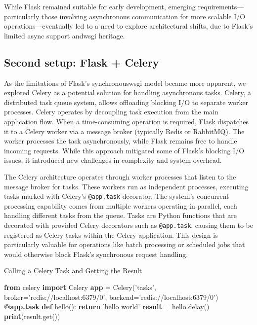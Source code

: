         While Flask remained suitable for early development, emerging requirements—particularly those involving asynchronous 
        communication for more scalable I/O operations—eventually led to a need to explore architectural shifts, due to 
        Flask's limited async support and\ac{wsgi} heritage. 
    
    \subsection{Second setup: Flask + Celery}

        As the limitations of Flask's synchronous\ac{wsgi} model became more apparent, we explored Celery as a potential solution for handling 
        asynchronous tasks. Celery, a distributed task queue system, allows offloading blocking I/O to separate worker processes. 
        Celery operates by decoupling task execution from the main application flow. When a time-consuming operation is required, Flask 
        dispatches it to a Celery worker via a message broker (typically Redis or RabbitMQ). The worker processes the task asynchronously, 
        while Flask remains free to handle incoming requests. While this approach mitigated some of Flask's blocking I/O issues, it 
        introduced new challenges in complexity and system overhead.

        The Celery architecture operates through worker processes that listen to the message broker for tasks. These workers run as 
        independent processes, executing tasks marked with Celery's \texttt{@app.task} decorator. The system's concurrent processing 
        capability comes from multiple workers operating in parallel, each handling different tasks from the queue. Tasks are Python 
        functions that are decorated with provided Celery decorators such as \texttt{@app.task}, causing them to be registered as 
        Celery tasks within the Celery application. This design is particularly valuable for operations like batch processing or 
        scheduled jobs that would otherwise block Flask's synchronous request handling.

        \begin{algorithm}
            \caption{Calling a Celery Task and Getting the Result}\label{celery-call-result}
            \begin{algorithmic}[1]
            \State \textbf{from} celery \textbf{import} Celery
            \State
            \State \textbf{app} = Celery('tasks', broker='redis://localhost:6379/0', backend='redis://localhost:6379/0')
            \State
            \State \textbf{@app.task}
            \State \textbf{def} hello():
            \State \hspace{1em} \textbf{return} 'hello world'
            \State
            \State \textbf{result} = hello.delay()
            \State \textbf{print}(result.get())
            \end{algorithmic}
        \end{algorithm}

